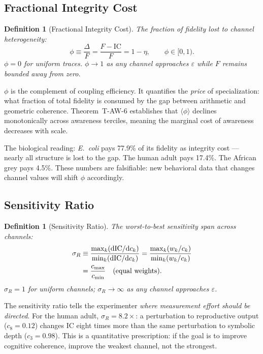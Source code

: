 \documentclass[
  aps,
  prd,
  twocolumn,
  superscriptaddress,
  nofootinbib,
  floatfix
]{revtex4-2}
\newtheorem{definition}[theorem]{Definition}
\newcommand{\eps}{\varepsilon}
\newcommand{\dd}{\mathrm{d}}
\newcommand{\beq}{\begin{equation}}
\newcommand{\eeq}{\end{equation}}
\newcommand{\IC}{\mathrm{IC}}
\begin{document}
\subsection{Fractional Integrity Cost}

\begin{definition}[Fractional Integrity Cost]\label{def:deltaf}
The fraction of fidelity lost to channel heterogeneity:
\beq\label{eq:deltaf}
  \phi \equiv \frac{\Delta}{F}
    = \frac{F - \IC}{F}
    = 1 - \eta,
  \qquad \phi \in [0, 1).
\eeq
$\phi = 0$ for uniform traces.  $\phi \to 1$ as any
channel approaches $\eps$ while $F$ remains bounded
away from zero.
\end{definition}

$\phi$ is the complement of coupling efficiency.  It
quantifies the \emph{price} of specialization: what
fraction of total fidelity is consumed by the gap between
arithmetic and geometric coherence.  Theorem~T-AW-6
establishes that $\langle\phi\rangle$ declines
monotonically across awareness terciles, meaning the
marginal cost of awareness decreases with scale.

The biological reading: \textit{E.~coli} pays 77.9\% of
its fidelity as integrity cost --- nearly all structure
is lost to the gap.  The human adult pays 17.4\%.  The
African grey pays 4.5\%.  These numbers are falsifiable:
new behavioral data that changes channel values will shift
$\phi$ accordingly.

\subsection{Sensitivity Ratio}

\begin{definition}[Sensitivity Ratio]\label{def:sensratio}
The worst-to-best sensitivity span across channels:
\begin{align}\label{eq:sensratio}
  \sigma_R &\equiv
    \frac{\max_k(\dd\IC/\dd c_k)}{\min_k(\dd\IC/\dd c_k)}
    = \frac{\max_k(w_k/c_k)}{\min_k(w_k/c_k)} \notag\\
    &= \frac{c_{\max}}{c_{\min}}
  \quad (\text{equal weights}).
\end{align}
$\sigma_R = 1$ for uniform channels; $\sigma_R \to \infty$
as any channel approaches $\eps$.
\end{definition}

The sensitivity ratio tells the experimenter \emph{where
measurement effort should be directed}.  For the human
adult, $\sigma_R = 8.2\times$: a perturbation to
reproductive output ($c_8 = 0.12$) changes $\IC$ eight
times more than the same perturbation to symbolic depth
($c_3 = 0.98$).  This is a quantitative prescription:
if the goal is to improve cognitive coherence, improve
the weakest channel, not the strongest.
\end{document}
